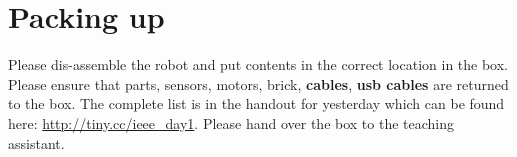 \documentclass[11pt]{article}
\def\bluehref#1#2{\href{#1}{\color{blue} #2}}
\begin{document}

\section*{Packing up}
Please dis-assemble the robot and put contents in the correct location in the box. Please ensure that parts, sensors, motors, brick, {\bf cables}, {\bf usb cables} are returned to the box. The complete list is in the handout for yesterday which can be found here: \bluehref{http://tiny.cc/ieee\_day1}{http://tiny.cc/ieee\_day1}. Please hand over the box to the teaching assistant.
\end{document}
